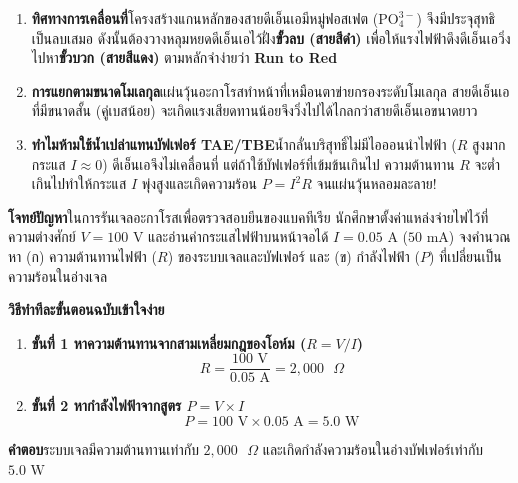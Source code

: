 \vspace{4pt}


\begin{bioappbox}
\begin{enumerate}
    \item \textbf{ทิศทางการเคลื่อนที่}\quad โครงสร้างแกนหลักของสายดีเอ็นเอมีหมู่ฟอสเฟต ($\text{PO}_4^{3-}$) จึงมีประจุสุทธิเป็นลบเสมอ ดังนั้นต้องวางหลุมหยดดีเอ็นเอไว้ฝั่ง\textbf{ขั้วลบ (สายสีดำ)} เพื่อให้แรงไฟฟ้าดึงดีเอ็นเอวิ่งไปหา\textbf{ขั้วบวก (สายสีแดง)} ตามหลักจำง่ายว่า \textbf{Run to Red}
    \item \textbf{การแยกตามขนาดโมเลกุล}\quad แผ่นวุ้นอะกาโรสทำหน้าที่เหมือนตาข่ายกรองระดับโมเลกุล สายดีเอ็นเอที่มีขนาดสั้น (คู่เบสน้อย) จะเกิดแรงเสียดทานน้อยจึงวิ่งไปได้ไกลกว่าสายดีเอ็นเอขนาดยาว
    \item \textbf{ทำไมห้ามใช้น้ำเปล่าแทนบัฟเฟอร์ TAE/TBE}\quad น้ำกลั่นบริสุทธิ์ไม่มีไอออนนำไฟฟ้า ($R$ สูงมาก กระแส $I \approx 0$) ดีเอ็นเอจึงไม่เคลื่อนที่ แต่ถ้าใช้บัฟเฟอร์ที่เข้มข้นเกินไป ความต้านทาน $R$ จะต่ำเกินไปทำให้กระแส $I$ พุ่งสูงและเกิดความร้อน $P = I^2R$ จนแผ่นวุ้นหลอมละลาย!
\end{enumerate}
\end{bioappbox}

\begin{worked}
\textbf{โจทย์ปัญหา}\quad ในการรันเจลอะกาโรสเพื่อตรวจสอบยีนของแบคทีเรีย นักศึกษาตั้งค่าแหล่งจ่ายไฟไว้ที่ความต่างศักย์ $V = 100\text{ V}$ และอ่านค่ากระแสไฟฟ้าบนหน้าจอได้ $I = 0.05\text{ A}$ ($50\text{ mA}$) จงคำนวณหา (ก) ความต้านทานไฟฟ้า ($R$) ของระบบเจลและบัฟเฟอร์ และ (ข) กำลังไฟฟ้า ($P$) ที่เปลี่ยนเป็นความร้อนในอ่างเจล

\textbf{วิธีทำทีละขั้นตอนฉบับเข้าใจง่าย}
\begin{enumerate}
    \item \textbf{ขั้นที่ 1 หาความต้านทานจากสามเหลี่ยมกฎของโอห์ม ($R = V / I$)}
    \[
        R = \frac{100\text{ V}}{0.05\text{ A}} = 2{,}000\text{ }\Omega
    \]
    \item \textbf{ขั้นที่ 2 หากำลังไฟฟ้าจากสูตร $P = V \times I$}
    \[
        P = 100\text{ V} \times 0.05\text{ A} = 5.0\text{ W}
    \]
\end{enumerate}
\textbf{คำตอบ}\quad ระบบเจลมีความต้านทานเท่ากับ $2{,}000\text{ }\Omega$ และเกิดกำลังความร้อนในอ่างบัฟเฟอร์เท่ากับ $5.0\text{ W}$
\end{worked}


